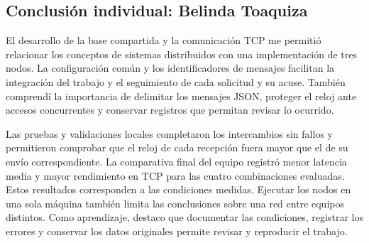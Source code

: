 \subsection{Conclusión individual: Belinda Toaquiza}

El desarrollo de la base compartida y la comunicación TCP me permitió relacionar
los conceptos de sistemas distribuidos con una implementación de tres nodos.
La configuración común y los identificadores de mensajes facilitan la integración
del trabajo y el seguimiento de cada solicitud y su acuse. También comprendí la
importancia de delimitar los mensajes JSON, proteger el reloj ante accesos
concurrentes y conservar registros que permitan revisar lo ocurrido.

Las pruebas y validaciones locales completaron los intercambios sin fallos y
permitieron comprobar que el reloj de cada recepción fuera mayor que el de su
envío correspondiente. La comparativa final del equipo registró menor latencia
media y mayor rendimiento en TCP para las cuatro combinaciones evaluadas.
Estos resultados corresponden a las condiciones medidas. Ejecutar los nodos
en una sola máquina también limita
las conclusiones sobre una red entre equipos distintos. Como aprendizaje,
destaco que documentar las condiciones, registrar los errores y conservar los
datos originales permite revisar y reproducir el trabajo.
